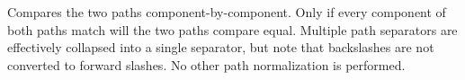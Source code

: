 \noindent\makebox[\linewidth]{\rule{\columnwidth}{1pt}}
\begin{center}  \end{center}
Compares the two paths component-by-component. Only if every component of both paths match will the two paths compare equal. Multiple path separators are effectively collapsed into a single separator, but note that backslashes are not converted to forward slashes. No other path normalization is performed. \\